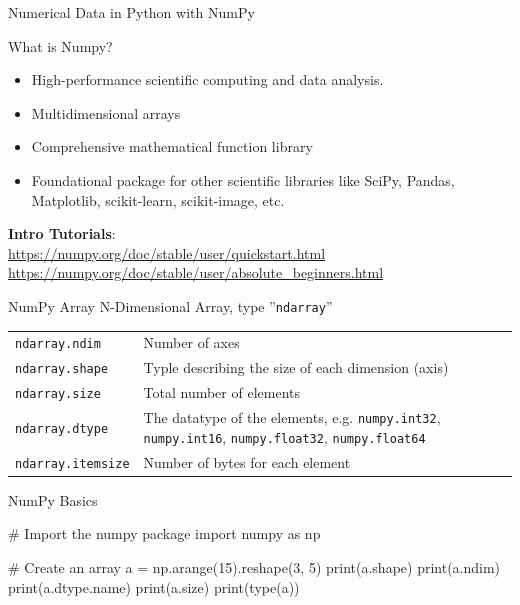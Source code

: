 \documentclass[ignorenonframetext,xcolor=x11names]{beamer}
\begin{document}
\begin{frame}{Numerical Data in Python with NumPy}
\begin{block}{What is Numpy?}
\begin{itemize}
    \item High-performance scientific computing and data analysis.    
    \item Multidimensional arrays
    \item Comprehensive mathematical function library
    \item Foundational package for other scientific libraries like SciPy, Pandas, Matplotlib, scikit-learn, scikit-image, etc.
\end{itemize}
\end{block}
\vspace{5mm}
\textbf{Intro Tutorials}: \\

\url{https://numpy.org/doc/stable/user/quickstart.html} \\
\url{https://numpy.org/doc/stable/user/absolute_beginners.html}
\end{frame}

\begin{frame}{NumPy Array}
N-Dimensional Array, type ''\texttt{ndarray}'' \\

\renewcommand{\arraystretch}{1.5}
\centering

\footnotesize
\begin{tabularx}{\linewidth}{l|X} \hline
\texttt{ndarray.ndim} & Number of axes \\
\texttt{ndarray.shape} & Typle describing the size of each dimension (axis) \\
\texttt{ndarray.size} & Total number of elements \\
\texttt{ndarray.dtype} & The datatype of the elements, e.g. \texttt{numpy.int32}, \texttt{numpy.int16}, \texttt{numpy.float32}, \texttt{numpy.float64} \\
\texttt{ndarray.itemsize} & Number of bytes for each element \\ \hline
\end{tabularx}
\end{frame}

\begin{frame}[fragile]{NumPy Basics}
\footnotesize
\begin{pythoncode}
# Import the numpy package
import numpy as np

# Create an array
a = np.arange(15).reshape(3, 5)
print(a.shape)
print(a.ndim)
print(a.dtype.name)
print(a.size)
print(type(a))
\end{pythoncode}
\end{frame}
\end{document}
